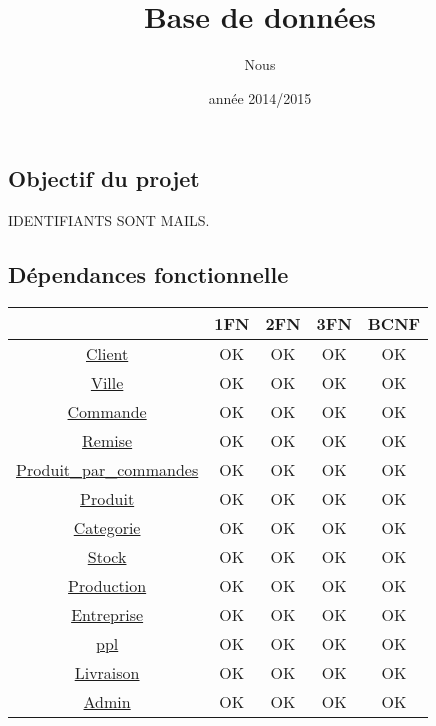 \documentclass[a4paper, 12pt]{report}
\title{Base de données}
\author{Nous}
\date{année 2014/2015}
\begin{document}
    \begin{spacing}{1.2}
\maketitle%
\newpage

\textcolor{colortitre1}{\section*{Objectif du projet}} 


IDENTIFIANTS SONT MAILS.

\textcolor{colortitre2}{\subsection*{Dépendances fonctionnelle}} 

\begin{table}
    \label{multiprogram}
    \begin{tabular}{c|c|c|c|c|}
        \cline{2-5}
         & 1FN & 2FN & 3FN & BCNF \\
        \hline
        \multicolumn{1}{|c|}{\hyperlink{Client}{Client}} & OK & OK & OK & OK \\
        \hline
        \multicolumn{1}{|c|}{\hyperlink{Ville}{Ville}} & OK & OK & OK & OK \\
        \hline
        \multicolumn{1}{|c|}{\hyperlink{Commande}{Commande}} & OK & OK & OK & OK \\
        \hline
        \multicolumn{1}{|c|}{\hyperlink{Remise}{Remise}} & OK & OK & OK & OK \\
        \hline
        \multicolumn{1}{|c|}{\hyperlink{ppc}{Produit\_par\_commandes}} & OK & OK & OK & OK \\
        \hline
        \multicolumn{1}{|c|}{\hyperlink{Produit}{Produit}} & OK & OK & OK & OK \\
        \hline
        \multicolumn{1}{|c|}{\hyperlink{Categorie}{Categorie}} & OK & OK & OK & OK \\
        \hline
        \multicolumn{1}{|c|}{\hyperlink{Stock}{Stock}} & OK & OK & OK & OK \\
        \hline
        \multicolumn{1}{|c|}{\hyperlink{Production}{Production}} & OK & OK & OK & OK \\
        \hline
        \multicolumn{1}{|c|}{\hyperlink{Entreprise}{Entreprise}} & OK & OK & OK & OK \\
        \hline
        \multicolumn{1}{|c|}{\hyperlink{Produit\_par\_livraison}{ppl}} & OK & OK & OK & OK \\
        \hline
        \multicolumn{1}{|c|}{\hyperlink{Livraison}{Livraison}} & OK & OK & OK & OK \\
        \hline
        \multicolumn{1}{|c|}{\hyperlink{Admin}{Admin}} & OK & OK & OK & OK \\
        \hline
    \end{tabular}
\end{table}
    

\end{spacing}
\end{document}
